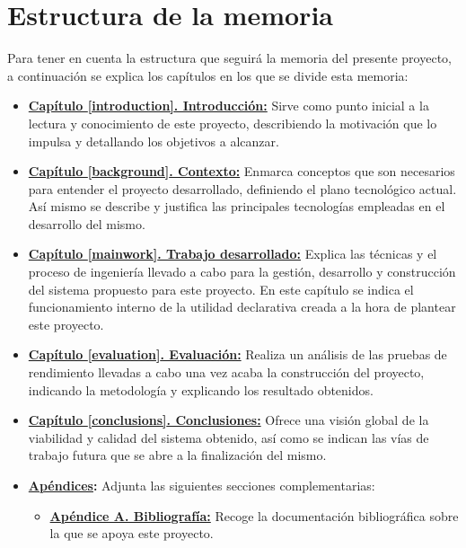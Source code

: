 \section{Estructura de la memoria}

Para tener en cuenta la estructura que seguirá la memoria del presente proyecto, a continuación se explica los capítulos en los que se divide esta memoria:

\begin{itemize}
	\item \textbf{\hyperlink{introduccion}{Capítulo \ref*{introduction}. Introducción:}} Sirve como punto inicial a la lectura y conocimiento de este proyecto, describiendo la motivación que lo impulsa y detallando los objetivos a alcanzar.
	\item \textbf{\hyperlink{background}{Capítulo \ref*{background}. Contexto:}} Enmarca conceptos que son necesarios para entender el proyecto desarrollado, definiendo el plano tecnológico actual. Así mismo se describe y justifica las principales tecnologías empleadas en el desarrollo del mismo.
	\item \textbf{\hyperlink{mainwork}{Capítulo \ref*{mainwork}. Trabajo desarrollado:}} Explica las técnicas y el proceso de ingeniería llevado a cabo para la gestión, desarrollo y construcción del sistema propuesto para este proyecto. En este capítulo se indica el funcionamiento interno de la utilidad declarativa creada a la hora de plantear este proyecto.
	\item \textbf{\hyperlink{evaluation}{Capítulo \ref*{evaluation}. Evaluación:}} Realiza un análisis de las pruebas de rendimiento llevadas a cabo una vez acaba la construcción del proyecto, indicando la metodología y explicando los resultado obtenidos.
	\item \textbf{\hyperlink{conclusions}{Capítulo \ref*{conclusions}. Conclusiones:}} Ofrece una visión global de la viabilidad y calidad del sistema obtenido, así como se indican las vías de trabajo futura que se abre a la finalización del mismo.
	\item \textbf{\hyperlink{appendices}{Apéndices}:} Adjunta las siguientes secciones complementarias:
	\begin{itemize}
		\item \textbf{\hyperlink{bibliography}{Apéndice A. Bibliografía:}} Recoge la documentación bibliográfica sobre la que se apoya este proyecto.
	\end{itemize}
\end{itemize}

